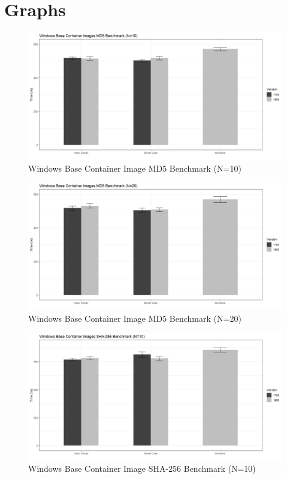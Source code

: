 \section{Graphs}
\begin{figure}[h]
	\captionsetup{width=0.8\linewidth}
	\includegraphics[width=0.9\linewidth]{img/Methodologie/Containers3.png}
	\centering
	\caption{Windows Base Container Image MD5 Benchmark (N=10)}
	\label{fig:MD5_10}
\end{figure}
\begin{figure}[h]
	\captionsetup{width=0.8\linewidth}
	\includegraphics[width=0.9\linewidth]{img/Methodologie/Containers1.png}
	\centering
	\caption{Windows Base Container Image MD5 Benchmark (N=20)}
	\label{fig:MD5_20}
\end{figure}
\begin{figure}[h]
	\captionsetup{width=0.8\linewidth}
	\includegraphics[width=0.9\linewidth]{img/Methodologie/Containers4.png}
	\centering
	\caption{Windows Base Container Image SHA-256 Benchmark (N=10)}
	\label{fig:SHA_10}
\end{figure}
